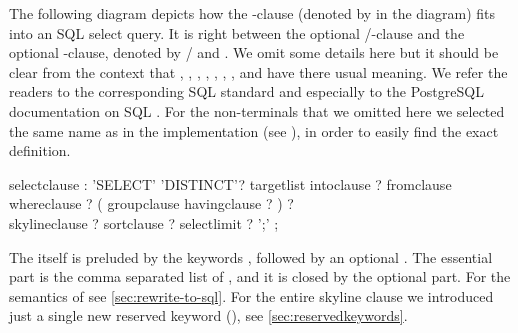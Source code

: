 

\railnontermfont{\rmfamily\itshape}
\railtermfont{\ttfamily\upshape\small}
\railboxheight 12pt
\railinit

The following diagram depicts how the -clause
(denoted by  in the diagram) fits into an SQL
select query.  It is right between the optional /-clause and the optional -clause, denoted by  /  and
. We omit some details here but it should be clear
from the context that , ,
, , ,
, , and  have
there usual meaning. We refer the readers to the corresponding SQL standard and
especially to the PostgreSQL documentation on SQL
. For the non-terminals that we omitted
here we selected the same name as in the implementation (see
), in order to easily find the exact definition.

%
\begin{rail}
selectclause :
    'SELECT' 'DISTINCT'? targetlist intoclause ? fromclause \\ 
    whereclause ? ( groupclause havingclause ? ) ? \\
    skylineclause ? sortclause ? selectlimit ? ';' ;
\end{rail}


The  itself is preluded by the keywords
, followed by an optional .
The essential part is the comma separated list of
, and it is closed by the optional 
 part. For the semantics of 
see \autoref{sec:rewrite-to-sql}. For the entire skyline clause we
introduced just a single new reserved keyword (),
see \autoref{sec:reservedkeywords}.

